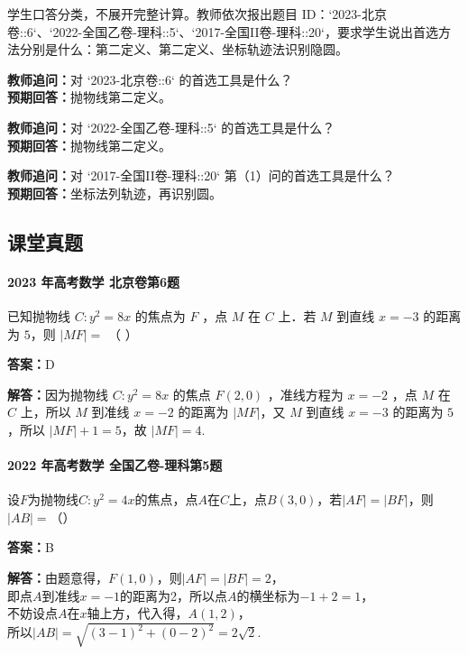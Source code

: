 \documentclass[UTF8,a4paper,11pt]{ctexart}
\begin{document}
学生口答分类，不展开完整计算。教师依次报出题目 ID：`2023-北京卷::6`、`2022-全国乙卷-理科::5`、`2017-全国II卷-理科::20`，要求学生说出首选方法分别是什么：第二定义、第二定义、坐标轨迹法识别隐圆。

\noindent\textbf{教师追问：}对 `2023-北京卷::6` 的首选工具是什么？\\

\textbf{预期回答：}抛物线第二定义。\par

\noindent\textbf{教师追问：}对 `2022-全国乙卷-理科::5` 的首选工具是什么？\\

\textbf{预期回答：}抛物线第二定义。\par

\noindent\textbf{教师追问：}对 `2017-全国II卷-理科::20` 第（1）问的首选工具是什么？\\

\textbf{预期回答：}坐标法列轨迹，再识别圆。\par

\subsection*{课堂真题}

\paragraph{2023 年高考数学 北京卷第6题}

已知抛物线 $C: y^2 = 8x$ 的焦点为 $F$ ，点 $M$ 在 $C$ 上．若 $M$ 到直线 $x = -3$ 的距离为 $5$，则 $|MF| =$ （ ）

\textbf{答案：}D\par

\textbf{解答：}因为抛物线 $C: y^2 = 8x$ 的焦点 $F(2,0)$ ，准线方程为 $x = -2$ ，点 $M$ 在 $C$ 上，所以 $M$ 到准线 $x = -2$ 的距离为 $|MF|$，又 $M$ 到直线 $x = -3$ 的距离为 $5$，所以 $|MF| + 1 = 5$，故 $|MF| = 4$.

\paragraph{2022 年高考数学 全国乙卷-理科第5题}

设$F$为抛物线$C: y^2 = 4x$的焦点，点$A$在$C$上，点$B(3, 0)$，若$|AF| = |BF|$，则$|AB| =$（\qquad）

\textbf{答案：}B\par

\textbf{解答：}由题意得，$F(1,0)$，则$|AF| = |BF| = 2$，\\即点$A$到准线$x=-1$的距离为2，所以点$A$的横坐标为$-1+2=1$，\\不妨设点$A$在$x$轴上方，代入得，$A(1,2)$，\\所以$|AB| = \sqrt{(3-1)^2 + (0-2)^2} = 2\sqrt{2}$.
\end{document}

